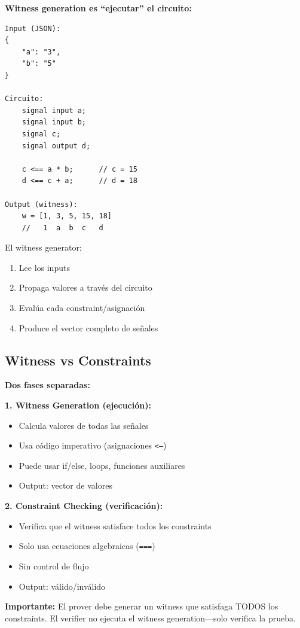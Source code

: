 \documentclass[11pt,a4paper,twoside,openright]{book}
\theoremstyle{definition}
\theoremstyle{plain}
\theoremstyle{remark}
\begin{document}
\begin{keyidea}
\textbf{Witness generation es ``ejecutar'' el circuito:}

\begin{verbatim}
Input (JSON):
{
    "a": "3",
    "b": "5"
}

Circuito:
    signal input a;
    signal input b;
    signal c;
    signal output d;
    
    c <== a * b;      // c = 15
    d <== c + a;      // d = 18

Output (witness):
    w = [1, 3, 5, 15, 18]
    //   1  a  b  c   d
\end{verbatim}

El witness generator:
\begin{enumerate}
    \item Lee los inputs
    \item Propaga valores a través del circuito
    \item Evalúa cada constraint/asignación
    \item Produce el vector completo de señales
\end{enumerate}
\end{keyidea}

\subsection{Witness vs Constraints}

\begin{mathnote}
\textbf{Dos fases separadas:}

\textbf{1. Witness Generation (ejecución):}
\begin{itemize}
    \item Calcula valores de todas las señales
    \item Usa código imperativo (asignaciones \texttt{<--})
    \item Puede usar if/else, loops, funciones auxiliares
    \item Output: vector de valores
\end{itemize}

\textbf{2. Constraint Checking (verificación):}
\begin{itemize}
    \item Verifica que el witness satisface todos los constraints
    \item Solo usa ecuaciones algebraicas (\texttt{===})
    \item Sin control de flujo
    \item Output: válido/inválido
\end{itemize}

\textbf{Importante:} El prover debe generar un witness que satisfaga TODOS los constraints. El verifier no ejecuta el witness generation---solo verifica la prueba.
\end{mathnote}
\end{document}
